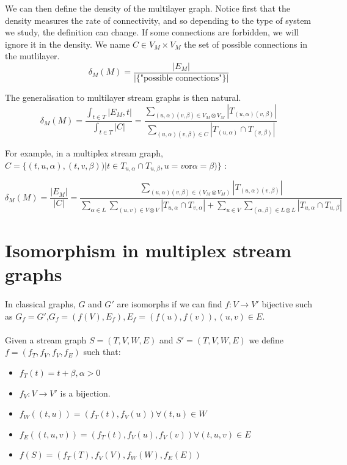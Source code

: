 \documentclass[dvipsnames,a4paper,11pt]{article}
\theoremstyle{definition}
\theoremstyle{remark}
\theoremstyle{remark}
\begin{document}
	We can then define the density of the multilayer graph. Notice first that the density measures the rate of connectivity, and so depending to the type of system we study, the definition can change. If some connections are forbidden, we will ignore it in the density. We name $C \in V_M\times V_M$ the set of possible connections in the mutlilayer.
	\[
		\delta_M (M) = \frac{|E_M|}{|\{\text{"possible connections"}\}|}
	\]

	The generalisation to multilayer stream graphs is then natural.
	\[
		\delta_M (M) = \frac{\int_{t\in T}|E_M,t|}{\int_{t\in T}|C|} = \frac{\sum_{(u,\alpha)(v,\beta) \in V_M \otimes V_M}|T_{(u,\alpha)(v,\beta)}|}{\sum_{(u,\alpha)(v,\beta) \in C}|T_{(u,\alpha)}\cap T_{(v,\beta)}|}
	\]

	For example, in a multiplex stream graph, $C=\{(t,u,\alpha),(t,v,\beta))| t\in T_{u,\alpha} \cap T_{u,\beta}, u=v \text{or} \alpha = \beta)\}$ :

	\[
		\delta_M (M) = \frac{|E_M|}{|C|}= \frac{\sum_{(u,\alpha)(v,\beta) \in (V_M \otimes V_M)} |T_{(u,\alpha)(v,\beta)}|}{\sum_{\alpha \in L}\sum_{(u,v) \in V\otimes V}|T_{u,\alpha} \cap T_{v,\alpha}|+ \sum_{u \in V } \sum_{(\alpha,\beta) \in L \otimes L}|T_{u,\alpha}\cap T_{u,\beta}|}
	\]

    \section{Isomorphism in multiplex stream graphs}
    \paragraph{}
    In classical graphs, $G$ and $G'$ are isomorphs if we can find $f:V \rightarrow V'$ bijective such as $G_f=G'$,$G_f=(f(V),E_f), E_f={(f(u),f(v)), (u,v) \in E}$.
    \paragraph{}
    Given a stream graph $S=(T,V,W,E)$ and $S'=(T,V,W,E)$ we define $f=(f_T,f_V,f_V,f_E)$ such that:
    \begin{itemize}
    	\item $f_T(t)= t + \beta, \alpha > 0$
    	\item $f_V:V\rightarrow V'$ is a bijection.
    	\item $f_W((t,u))=(f_T(t),f_V(u)) \forall (t,u) \in W$
    	\item $f_E((t,u,v))=(f_T(t),f_V(u),f_V(v)) \forall (t,u,v) \in E$
    	\item $f(S)=(f_T(T),f_V(V),f_W(W),f_E(E))$
    \end{itemize}
\end{document}
